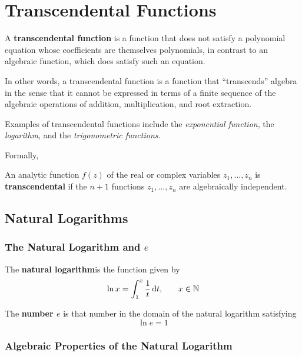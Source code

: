 \chapter{Transcendental Functions}

\begin{defn}
  A \textbf{transcendental function} is a function that does not satisfy a polynomial equation whose coefficients are themselves polynomials, in contrast to an algebraic function, which does satisfy such an equation.
\end{defn}

In other words, a transcendental function is a function that ``transcends'' algebra in the sense that it cannot be expressed in terms of a finite sequence of the algebraic operations of addition, multiplication, and root extraction.

Examples of transcendental functions include the \emph{exponential function}, the \emph{logarithm}, and the \emph{trigonometric functions}.

Formally,

\begin{defn}
  An analytic function \(f(z)\) of the real or complex variables \(z_1, \ldots, z_n\) is \textbf{transcendental} if the \(n+1\) functions \(z_1, \ldots, z_n\) are algebraically independent.
  \cite{wiki:transcendental}
\end{defn}

\section{Natural Logarithms}

\subsection{The Natural Logarithm and $e$}

\begin{defn}
	The \textbf{natural logarithm}is the function given by
  \begin{equation}
    \ln x = \int ^{x} _{1} \frac{1}{t} \,\mathrm{d} t \text{,} \qquad x \in \mathbb{N}
  \end{equation}
\end{defn}
\begin{defn}
  The \textbf{number $e$} is that number in the domain of the natural logarithm satisfying
  \[ \ln{e}=1 \]
\end{defn}


\subsection{Algebraic Properties of the Natural Logarithm}

